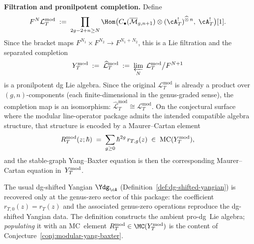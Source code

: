 \begin{definition}
\noindent\textbf{Filtration and pronilpotent completion.}\;
Define
\[
 F^N \mathcal{L}_T^{\mathrm{mod}}
 \;:=\;
 \prod_{2g-2+n \ge N}
 \Hom\bigl(
 C_\bullet(\overline{\mathcal{M}}_{g,n+1})
 \otimes (\cA_T^!)^{\widehat{\otimes}\,n},\;
 \cA_T^!
 \bigr)[1].
\]
Since the bracket maps
$F^{N_1} \times F^{N_2} \to F^{N_1+N_2}$,
this is a Lie filtration and the separated completion
\[
 Y^{\mathrm{mod}}_T
 \;:=\;
 \widehat{\mathcal{L}}_T^{\mathrm{mod}}
 \;:=\;
 \varprojlim_N\;
 \mathcal{L}_T^{\mathrm{mod}} \big/ F^{N+1}
\]
is a pronilpotent dg Lie algebra. Since the original
$\mathcal{L}_T^{\mathrm{mod}}$ is already a product over
$(g,n)$-components (each finite-dimensional in the
genus-graded sense), the completion map is an isomorphism:
$\widehat{\mathcal{L}}_T^{\mathrm{mod}} \cong
\mathcal{L}_T^{\mathrm{mod}}$.
On the conjectural surface where the modular line-operator package
admits the intended compatible algebra structure, that structure is
encoded by a Maurer--Cartan element
\[
 R_T^{\mathrm{mod}}(z;\hbar)
 \;=\;
 \sum_{g \ge 0} \hbar^{2g}\, r_{T,g}(z)
 \;\in\;
 \operatorname{MC}(Y^{\mathrm{mod}}_T),
\]
and the stable-graph Yang--Baxter equation is then the
corresponding Maurer--Cartan equation in~$Y^{\mathrm{mod}}_T$.

The usual dg-shifted Yangian
$\Ydg_{\cA}$
(Definition~\ref{def:dg-shifted-yangian})
is recovered only at the genus-zero sector of this package: the
coefficient $r_{T,0}(z)=r_T(z)$ and the associated genus-zero
operations reproduce the dg-shifted Yangian data.
The definition constructs the ambient pro-dg~Lie algebra;
\emph{populating} it with an MC~element
$R_T^{\mathrm{mod}} \in \MC(\Ymod_T)$ is the content of
Conjecture~\ref{conj:modular-yang-baxter}.
\end{definition}

